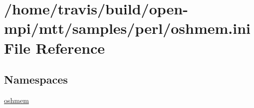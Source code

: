 \hypertarget{oshmem_8ini}{\section{/home/travis/build/open-\/mpi/mtt/samples/perl/oshmem.ini File Reference}
\label{oshmem_8ini}
}
\subsection*{Namespaces}
\begin{DoxyCompactItemize}
\item 
\hyperlink{namespaceoshmem}{oshmem}
\end{DoxyCompactItemize}
